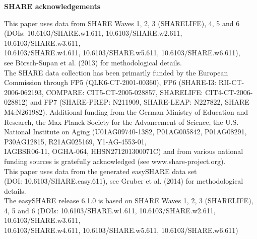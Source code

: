 

\textbf{SHARE acknowledgements}

This paper uses data from SHARE Waves 1, 2, 3 (SHARELIFE), 4, 5 and 6 (DOIs: 10.6103/SHARE.w1.611, 10.6103/SHARE.w2.611, 10.6103/SHARE.w3.611, \\
10.6103/SHARE.w4.611, 10.6103/SHARE.w5.611,
10.6103/SHARE.w6.611), \\ see Börsch-Supan et al. (2013) for methodological details.\\

The SHARE data collection has been primarily funded by the European Commission through FP5 (QLK6-CT-2001-00360), FP6 (SHARE-I3: RII-CT-2006-062193, COMPARE: CIT5-CT-2005-028857, SHARELIFE: CIT4-CT-2006-028812) and FP7 (SHARE-PREP: N211909, SHARE-LEAP: N227822, SHARE M4:N261982). Additional funding from the German Ministry of Education and Research, the Max Planck Society for the Advancement of Science, the U.S. National Institute on Aging (U01\textunderscore AG09740-13S2, P01\textunderscore AG005842, P01\textunderscore AG08291, P30\textunderscore AG12815, R21\textunderscore AG025169, Y1-AG-4553-01,\\ IAG\textunderscore BSR06-11, OGHA-064, HHSN271201300071C) and from various national funding sources is gratefully acknowledged (see www.share-project.org).\\

This paper uses data from the generated easySHARE data set \\
(DOI: 10.6103/SHARE.easy.611), see Gruber et al. (2014) for methodological details.\\
The easySHARE release 6.1.0 is based on SHARE Waves 1, 2, 3 (SHARELIFE), 4, 5 and 6 (DOIs: 10.6103/SHARE.w1.611, 10.6103/SHARE.w2.611, 10.6103/SHARE.w3.611,\\
10.6103/SHARE.w4.611, 
10.6103/SHARE.w5.611, 10.6103/SHARE.w6.611)


